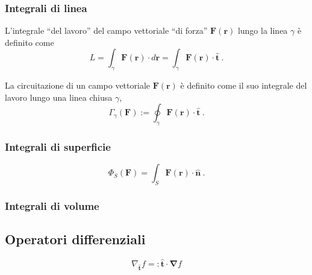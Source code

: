 \subsubsection{Integrali di linea}
\begin{definition}[Lavoro] L'integrale ``del lavoro'' del campo vettoriale ``di forza'' $\mathbf{F}(\mathbf{r})$ lungo la linea $\gamma$ è definito come
    \begin{equation}
        L = \int_{\gamma} \mathbf{F}(\mathbf{r}) \cdot d \mathbf{r} = \int_{\gamma} \mathbf{F}(\mathbf{r}) \cdot \mathbf{\hat{t}} \ . 
    \end{equation}
\end{definition}
\begin{definition}[Circuitazione] La circuitazione di un campo vettoriale $\mathbf{F}(\mathbf{r})$ è definito come il suo integrale del lavoro lungo una linea chiusa $\gamma$,
    \begin{equation}
        \Gamma_{\gamma}(\mathbf{F}) := \oint_{\gamma} \mathbf{F}(\mathbf{r}) \cdot \mathbf{\hat{t}} \ .
    \end{equation}
\end{definition}
\subsubsection{Integrali di superficie}
\begin{definition}[Flusso]
    \begin{equation}
        \Phi_S(\mathbf{F}) = \int_S \mathbf{F}(\mathbf{r}) \cdot \mathbf{\hat{n}} \ .
    \end{equation}
\end{definition}
\subsubsection{Integrali di volume}

\subsection{Operatori differenziali}
\begin{definition}[Gradiente]
    \begin{equation}
        \nabla_{\mathbf{\hat{t}}} f =: \mathbf{\hat{t}} \cdot \mathbf{\nabla} f
    \end{equation}
\end{definition}
\begin{property}
\end{property}
\begin{property}
\end{property}
\begin{property}
\end{property}

